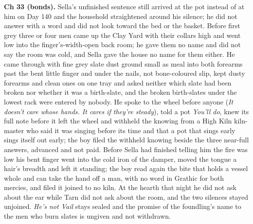 \documentclass{design/chronicle}
\begin{document}
{\textbf{Ch 33 (bonds).} Sella’s unfinished sentence still arrived at the pot instead of at him on Day 140 and the household straightened around his silence; he did not answer with a word and did not look toward the bed or the basket. Before first grey three or four men came up the Clay Yard with their collars high and went low into the finger’s-width-open back room; he gave them no name and did not say the room was cold, and Sella gave the house no name for them either. He came through with fine grey slate dust ground small as meal into both forearms past the bent little finger and under the nails, not bone-coloured slip, kept dusty forearms and clean ones on one tray and asked neither which slate had been broken nor whether it was a birth-slate, and the broken birth-slates under the lowest rack were entered by nobody. He spoke to the wheel before anyone (\emph{It doesn’t care whose hands. It cares if they’re steady}), told a pot \emph{You’ll do}, knew its full note before it left the wheel and withheld the knowing from a High Kiln kiln-master who said it was singing before its time and that a pot that sings early sings itself out early; the boy filed the withheld knowing beside the three near-full answers, advanced and not paid. Before Sella had finished telling him the fire was low his bent finger went into the cold iron of the damper, moved the tongue a hair’s breadth and left it standing; the boy read again the bite that holds a vessel whole and can take the hand off a man, with no word in Grathic for both mercies, and filed it joined to no kiln. At the hearth that night he did not ask about the ear while Tarn did not ask about the room, and the two silences stayed unjoined. \emph{He’s not Vail} stays sealed and the promise of the foundling’s name to the men who burn slates is ungiven and not withdrawn.

}
\end{document}
